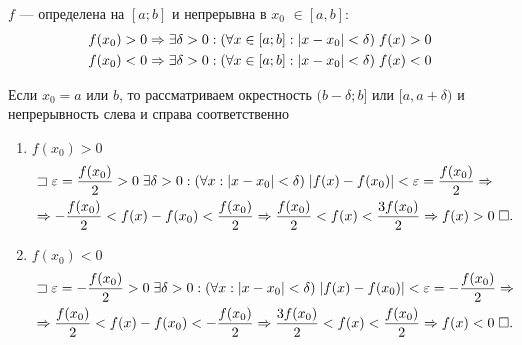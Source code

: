 \documentclass{article}
\begin{document}

\theorem

$f$ --- определена на $[a;b]$ и непрерывна в $x_0$ $\in [a,b]$:
\begin{align*}
	 & f(x_0)>0\Rightarrow\exists\delta>0:(\forall x\in[a;b]:|x-x_0|<\delta)\;f(x)>0 \\
	 & f(x_0)<0\Rightarrow\exists\delta>0:(\forall x\in[a;b]:|x-x_0|<\delta)\;f(x)<0
\end{align*}

Если $x_0=a$ или $b$, то рассматриваем окрестность $(b-\delta; b]$ или $[a, a + \delta)$ и непрерывность слева и справа соответственно

\proof

\begin{enumerate}
	\item{}$f(x_0)>0$
	\begin{align*}
		 & \sqsupset\varepsilon=\frac{f(x_0)}{2}>0\;\exists\delta>0:(\forall x:|x-x_0|<\delta)\;|f(x)-f(x_0)|<\varepsilon=\frac{f(x_0)}{2}\Rightarrow \\
		 & \Rightarrow -\frac{f(x_0)}{2}<f(x)-f(x_0)<\frac{f(x_0)}{2}\Rightarrow \frac{f(x_0)}{2}<f(x)<\frac{3f(x_0)}{2}\Rightarrow f(x)>0\;\square.
	\end{align*}
	\item{}$f(x_0)<0$
	\begin{align*}
		 & \sqsupset\varepsilon=-\frac{f(x_0)}{2}>0\;\exists\delta>0:(\forall x:|x-x_0|<\delta)\;|f(x)-f(x_0)|<\varepsilon=-\frac{f(x_0)}{2}\Rightarrow \\
		 & \Rightarrow \frac{f(x_0)}{2}<f(x)-f(x_0)<-\frac{f(x_0)}{2}\Rightarrow \frac{3f(x_0)}{2}<f(x)<\frac{f(x_0)}{2}\Rightarrow f(x)<0\;\square.
	\end{align*}
\end{enumerate}
\end{document}
